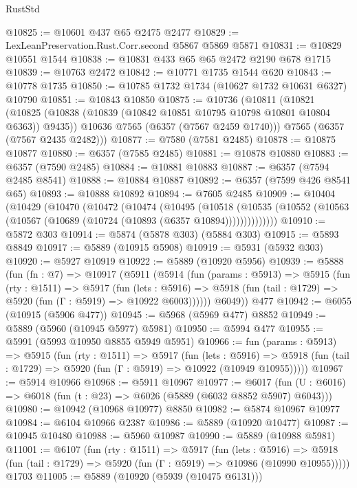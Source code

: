 \begin{lexlean}{RustStd}
\begin{coremodule}
@10825 := @10601 @437 @65 @2475 @2477
@10829 := LexLeanPreservation.Rust.Corr.second @5867 @5869 @5871
@10831 := @10829 @10551 @1544
@10838 := @10831 @433 @65 @65 @2472 @2190 @678 @1715
@10839 := @10763 @2472
@10842 := @10771 @1735 @1544 @620
@10843 := @10778 @1735
@10850 := @10785 @1732 @1734 (@10627 @1732 @10631 @6327) @10790
@10851 := @10843 @10850
@10875 := @10736
    (@10811
      (@10821
        (@10825 (@10838 (@10839 (@10842 @10851 @10795 @10798 @10801 @10804 @6363)) @9435))
        @10636
        @7565
        (@6357 (@7567 @2459 @1740)))
      @7565
      (@6357 (@7567 @2435 @2482)))
@10877 := @7580 (@7581 @2485)
@10878 := @10875 @10877
@10880 := @6357 (@7585 @2485)
@10881 := @10878 @10880
@10883 := @6357 (@7590 @2485)
@10884 := @10881 @10883
@10887 := @6357 (@7594 @2485 @8541)
@10888 := @10884 @10887
@10892 := @6357 (@7599 @426 @8541 @65)
@10893 := @10888 @10892
@10894 := @7605 @2485
@10909 := @10404
    (@10429
      (@10470
        (@10472
          (@10474
            (@10495
              (@10518
                (@10535 (@10552 (@10563 (@10567 (@10689 (@10724 (@10893 (@6357 @10894))))))))))))))
@10910 := @5872 @303
@10914 := @5874 (@5878 @303) (@5884 @303)
@10915 := @5893 @8849
@10917 := @5889 (@10915 @5908)
@10919 := @5931 (@5932 @303)
@10920 := @5927 @10919
@10922 := @5889 (@10920 @5956)
@10939 := @5888
    (fun (fn : @7) =>
    @10917
      (@5911
        (@5914
          (fun (params : @5913) =>
          @5915
            (fun (rty : @1511) =>
            @5917
              (fun (lets : @5916) =>
              @5918 (fun (tail : @1729) => @5920 (fun (Γ : @5919) => @10922 @6003))))))
        @6049))
    @477
@10942 := @6055 (@10915 (@5906 @477))
@10945 := @5968 (@5969 @477) @8852
@10949 := @5889 (@5960 (@10945 @5977) @5981)
@10950 := @5994 @477
@10955 := @5991 (@5993 @10950 @8855 @5949 @5951)
@10966 := fun (params : @5913) =>
  @5915
    (fun (rty : @1511) =>
    @5917
      (fun (lets : @5916) =>
      @5918 (fun (tail : @1729) => @5920 (fun (Γ : @5919) => @10922 (@10949 @10955)))))
@10967 := @5914 @10966
@10968 := @5911 @10967
@10977 := @6017
    (fun (U : @6016) => @6018 (fun (t : @23) => @6026 (@5889 (@6032 @8852 @5907) @6043)))
@10980 := @10942 (@10968 @10977) @8850
@10982 := @5874 @10967 @10977
@10984 := @6104 @10966 @2387
@10986 := @5889 (@10920 @10477)
@10987 := @10945 @10480
@10988 := @5960 @10987
@10990 := @5889 (@10988 @5981)
@11001 := @6107
    (fun (rty : @1511) =>
    @5917
      (fun (lets : @5916) =>
      @5918 (fun (tail : @1729) => @5920 (fun (Γ : @5919) => @10986 (@10990 @10955)))))
    @1703
@11005 := @5889 (@10920 (@5939 (@10475 @6131)))

\end{coremodule}
\end{lexlean}
